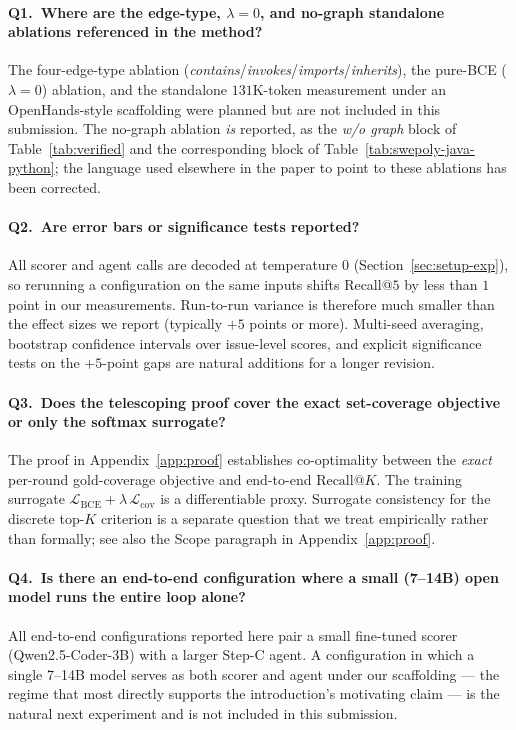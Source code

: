 \paragraph{Q1.\ Where are the edge-type, $\lambda{=}0$, and
no-graph standalone ablations referenced in the method?}
The four-edge-type ablation
(\textit{contains}/\textit{invokes}/\textit{imports}/\textit{inherits}),
the pure-BCE ($\lambda{=}0$) ablation, and the standalone
$131$K-token measurement under an OpenHands-style scaffolding
were planned but are not included in this submission. The no-graph
ablation \emph{is} reported, as the \emph{w/o graph} block of
Table~\ref{tab:verified} and the corresponding block of
Table~\ref{tab:swepoly-java-python}; the language used elsewhere
in the paper to point to these ablations has been corrected.

\paragraph{Q2.\ Are error bars or significance tests reported?}
All scorer and agent calls are decoded at temperature $0$
(Section~\ref{sec:setup-exp}), so rerunning a configuration on
the same inputs shifts Recall@$5$ by less than $1$ point in our
measurements. Run-to-run variance is therefore much smaller than
the effect sizes we report (typically $+5$ points or more).
Multi-seed averaging, bootstrap confidence intervals over
issue-level scores, and explicit significance tests on the
$+5$-point gaps are natural additions for a longer revision.

\paragraph{Q3.\ Does the telescoping proof cover the exact
set-coverage objective or only the softmax surrogate?}
The proof in Appendix~\ref{app:proof} establishes co-optimality
between the \emph{exact} per-round gold-coverage objective and
end-to-end $\text{Recall}@K$. The training surrogate
$\mathcal{L}_{\text{BCE}} + \lambda\, \mathcal{L}_{\text{cov}}$
is a differentiable proxy. Surrogate consistency for the
discrete top-$K$ criterion is a separate question that we treat
empirically rather than formally; see also the Scope paragraph
in Appendix~\ref{app:proof}.

\paragraph{Q4.\ Is there an end-to-end configuration where a
small (7--14B) open model runs the entire loop alone?}
All end-to-end configurations reported here pair a small
fine-tuned scorer (Qwen2.5-Coder-3B) with a larger Step-C agent.
A configuration in which a single 7--14B model serves as both
scorer and agent under our scaffolding --- the regime that most
directly supports the introduction's motivating claim --- is
the natural next experiment and is not included in this
submission.

